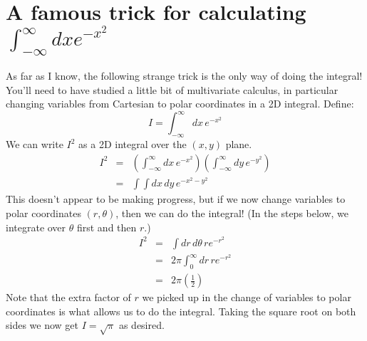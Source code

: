 \documentclass[aps,prd,superscriptaddress,groupedaddress,nofootinbib,nobibnotes]{revtex4}
\newcommand{\be}{\begin{equation}}
\newcommand{\ee}{\end{equation}}
\newcommand{\ba}{\begin{eqnarray}}
\newcommand{\ea}{\end{eqnarray}}
\newcommand{\nn}{\nonumber}
\begin{document}

%

% 
% 

\appendix
\section{A famous trick for calculating $\int_{-\infty}^\infty dx e^{-x^2}$}

\par\noindent
As far as I know, the following strange trick is the only way of doing the integral!
You'll need to have studied a little bit of multivariate calculus, in particular changing variables from
Cartesian to polar coordinates in a 2D integral.
Define:
\be
I = \int_{-\infty}^\infty dx \, e^{-x^2}
\ee
We can write $I^2$ as a 2D integral over the $(x,y)$ plane.
\ba
I^2 &=& \left( \int_{-\infty}^\infty dx \, e^{-x^2} \right) \left( \int_{-\infty}^\infty dy \, e^{-y^2} \right)  \nn \\
  &=& \int \int dx\, dy \, e^{-x^2-y^2}
\ea
This doesn't appear to be making progress, but if we now change variables to polar coordinates $(r,\theta)$,
then we can do the integral!  (In the steps below, we integrate over $\theta$ first and then $r$.)
\ba
I^2 &=& \int dr \, d\theta \, r e^{-r^2}  \nn \\
    &=& 2 \pi \int_0^\infty dr \, r e^{-r^2} \nn \\
    &=& 2 \pi \left( \frac{1}{2} \right)
\ea
Note that the extra factor of $r$ we picked up in the change of variables to polar coordinates is what
allows us to do the integral.  Taking the square root on both sides we now get $I = \sqrt{\pi}$ as desired.
\end{document}

